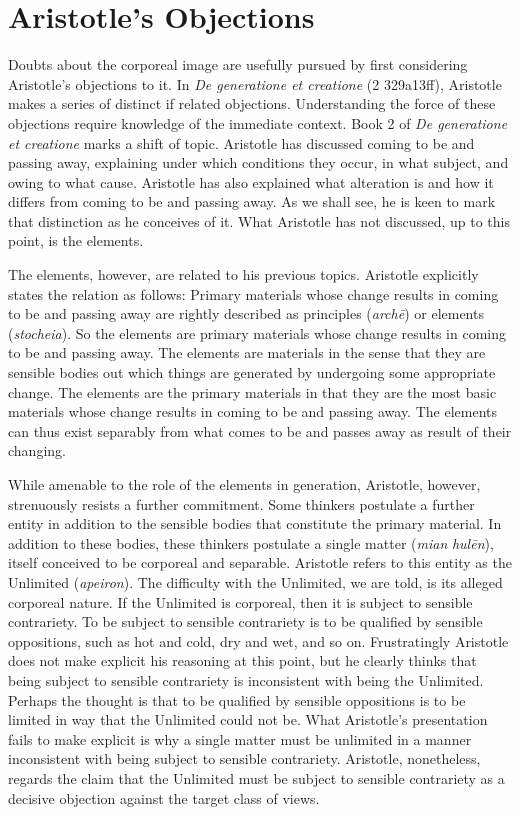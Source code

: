 
\section{Aristotle's Objections} %
\label{sec:aristotle_s_objections}

Doubts about the corporeal image are usefully pursued by first considering Aristotle's objections to it. In \emph{De generatione et creatione} (2 329a13ff), Aristotle makes a series of distinct if related objections. Understanding the force of these objections require knowledge of the immediate context. Book 2 of \emph{De generatione et creatione} marks a shift of topic. Aristotle has discussed coming to be and passing away, explaining under which conditions they occur, in what subject, and owing to what cause. Aristotle has also explained what alteration is and how it differs from coming to be and passing away. As we shall see, he is keen to mark that distinction as he conceives of it. What Aristotle has not discussed, up to this point, is the elements. 

The elements, however, are related to his previous topics. Aristotle explicitly states the relation as follows: Primary materials whose change results in coming to be and passing away are rightly described as principles (\emph{archē}) or elements (\emph{stocheia}). So the elements are primary materials whose change results in coming to be and passing away. The elements are materials in the sense that they are sensible bodies out which things are generated by undergoing some appropriate change. The elements are the primary materials in that they are the most basic materials whose change results in coming to be and passing away. The elements can thus exist separably from what comes to be and passes away as result of their changing.

While amenable to the role of the elements in generation, Aristotle, however, strenuously resists a further commitment. Some thinkers postulate a further entity in addition to the sensible bodies that constitute the primary material. In addition to these bodies, these thinkers postulate a single matter (\emph{mian} \emph{hulēn}), itself conceived to be corporeal and separable. Aristotle refers to this entity as the Unlimited (\emph{apeiron}). The difficulty with the Unlimited, we are told, is its alleged corporeal nature. If the Unlimited is corporeal, then it is subject to sensible contrariety. To be subject to sensible contrariety is to be qualified by sensible oppositions, such as hot and cold, dry and wet, and so on. Frustratingly Aristotle does not make explicit his reasoning at this point, but he clearly thinks that being subject to sensible contrariety is inconsistent with being the Unlimited. Perhaps the thought is that to be qualified by sensible oppositions is to be limited in way that the Unlimited could not be. What Aristotle's presentation fails to make explicit is why a single matter must be unlimited in a manner inconsistent with being subject to sensible contrariety. Aristotle, nonetheless, regards the claim that the Unlimited must be subject to sensible contrariety as a decisive objection against the target class of views.

